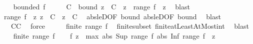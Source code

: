 \begin{isabellebody}
\isanewline
\ \ \isamarkupfalse%
\ {\isachardoublequoteopen}bounded\ f{\isachardoublequoteclose}\isanewline
\ \ \isamarkupfalse%
\ \isamarkupfalse%
\ C\ \ bound{\isacharcolon}{\kern0pt}\ {\isachardoublequoteopen}{\isasymbar}z{\isasymbar}\ {\isasymle}\ C{\isachardoublequoteclose}\ \ {\isachardoublequoteopen}z\ {\isasymin}\ range\ f{\isachardoublequoteclose}\ \ z\ \isamarkupfalse%
\ blast\isanewline
\ \ \isamarkupfalse%
\ {\isachardoublequoteopen}range\ f\ {\isasymsubseteq}\ {\isacharbraceleft}{\kern0pt}z{\isachardot}{\kern0pt}\ z\ {\isasymle}\ C\ {\isasymand}\ {\isacharminus}{\kern0pt}z\ {\isasymle}\ C{\isacharbraceright}{\kern0pt}{\isachardoublequoteclose}\ \isamarkupfalse%
\ abs{\isacharunderscore}{\kern0pt}le{\isacharunderscore}{\kern0pt}D{}{\isacharbrackleft}{\kern0pt}OF\ bound{\isacharbrackright}{\kern0pt}\ abs{\isacharunderscore}{\kern0pt}le{\isacharunderscore}{\kern0pt}D{}{\isacharbrackleft}{\kern0pt}OF\ bound{\isacharbrackright}{\kern0pt}\ \isamarkupfalse%
\ blast\isanewline
\ \ \isamarkupfalse%
\ \isamarkupfalse%
\ {\isachardoublequoteopen}{\isachardot}{\kern0pt}{\isachardot}{\kern0pt}{\isachardot}{\kern0pt}\ {\isacharequal}{\kern0pt}\ {\isacharbraceleft}{\kern0pt}{\isacharparenleft}{\kern0pt}{\isacharminus}{\kern0pt}C{\isacharparenright}{\kern0pt}{\isachardot}{\kern0pt}{\isachardot}{\kern0pt}C{\isacharbraceright}{\kern0pt}{\isachardoublequoteclose}\ \isamarkupfalse%
\ force\isanewline
\ \ \isamarkupfalse%
\ \isamarkupfalse%
\ {\isachardoublequoteopen}finite\ {\isacharparenleft}{\kern0pt}range\ f{\isacharparenright}{\kern0pt}{\isachardoublequoteclose}\ \isamarkupfalse%
\ finite{\isacharunderscore}{\kern0pt}subset\ finite{\isacharunderscore}{\kern0pt}atLeastAtMost{\isacharunderscore}{\kern0pt}int\ \isamarkupfalse%
\ blast\isanewline
{}\isamarkupfalse%
\isanewline
\ \ \isamarkupfalse%
\ {\isachardoublequoteopen}finite\ {\isacharparenleft}{\kern0pt}range\ f{\isacharparenright}{\kern0pt}{\isachardoublequoteclose}\isanewline
\ \ \isamarkupfalse%
\ {\isachardoublequoteopen}{\isasymbar}f\ z{\isasymbar}\ {\isasymle}\ max\ {\isacharparenleft}{\kern0pt}abs\ {\isacharparenleft}{\kern0pt}Sup\ {\isacharparenleft}{\kern0pt}range\ f{\isacharparenright}{\kern0pt}{\isacharparenright}{\kern0pt}{\isacharparenright}{\kern0pt}\ {\isacharparenleft}{\kern0pt}abs\ {\isacharparenleft}{\kern0pt}Inf\ {\isacharparenleft}{\kern0pt}range\ f{\isacharparenright}{\kern0pt}{\isacharparenright}{\kern0pt}{\isacharparenright}{\kern0pt}{\isachardoublequoteclose}\ \ z\ \isanewline

\end{isabellebody}
